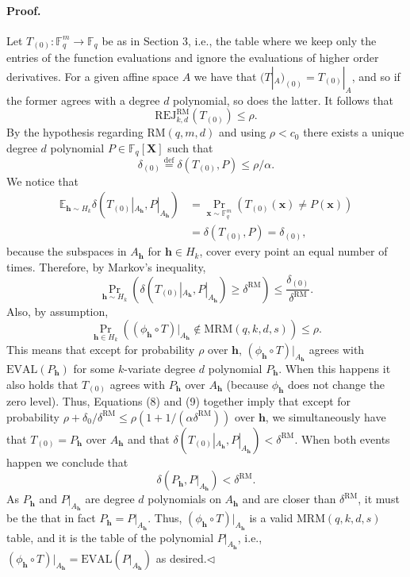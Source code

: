 \paragraph{Proof.} Let $T_{(0)}:\mathbb F_q^m\to\mathbb F_q$ be as in Section 3, i.e., the table where we keep only the entries of the function evaluations and ignore the evaluations of higher order derivatives. For a given affine space $A$ we have that $(T|_A)_{(0)}=T_{(0)}|_A$, and so if the former agrees with a degree $d$ polynomial, so does the latter. It follows that
\[\mathrm{REJ}_{k,d}^{\mathrm{RM}}(T_{(0)})\leq\rho.\]
By the hypothesis regarding $\mathrm{RM}(q,m,d)$ and using $\rho<c_0$ there exists a unique degree $d$ polynomial $P\in\mathbb F_q[\boldsymbol X]$ such that
\[\delta_{(0)}\stackrel{\mathrm{def}}=\delta(T_{(0)},P)\leq\rho/\alpha.\]
We notice that
\begin{align*}
\mathbb E_{\boldsymbol h\sim H_k}\delta(T_{(0)}|_{A_{\boldsymbol h}},P|_{A_{\boldsymbol h}})
&=\Pr_{\boldsymbol x\sim\mathbb F_q^m}(T_{(0)}(\boldsymbol x)\neq P(\boldsymbol x))\\
&=\delta(T_{(0)},P)=\delta_{(0)},
\end{align*}
because the subspaces in $A_{\boldsymbol h}$ for $\boldsymbol h\in H_k$, cover every point an equal number of times. Therefore, by Markov's inequality,
\[\Pr_{\boldsymbol h\sim H_k}(\delta(T_{(0)}|_{A_{\boldsymbol h}},P|_{A_{\boldsymbol h}})\geq\delta^{\mathrm{RM}})\leq\frac{\delta_{(0)}}{\delta^{\mathrm{RM}}}.\tag{8}\]
Also, by assumption,
\[\Pr_{\boldsymbol h\in H_k}((\phi_{\boldsymbol h}\circ T)|_{A_{\boldsymbol h}}\notin\mathrm{MRM}(q,k,d,s))\leq\rho.\tag{9}\]
This means that except for probability $\rho$ over $\boldsymbol h$, $(\phi_{\boldsymbol h}\circ T)|_{A_{\boldsymbol h}}$ agrees with $\mathrm{EVAL}(P_{\boldsymbol h})$ for some $k$-variate degree $d$ polynomial $P_{\boldsymbol h}$. When this happens it also holds that $T_{(0)}$ agrees with $P_{\boldsymbol h}$ over $A_{\boldsymbol h}$ (because $\phi_{\boldsymbol h}$ does not change the zero level).
Thus, Equations (8) and (9) together imply that except for probability $\rho+\delta_0/\delta^{\mathrm{RM}}\leq\rho(1+1/(\alpha\delta^{\mathrm{RM}}))$ over $\boldsymbol h$, we simultaneously have that $T_{(0)}=P_{\boldsymbol h}$ over $A_{\boldsymbol h}$ and that $\delta(T_{(0)}|_{A_{\boldsymbol h}},P|_{A_{\boldsymbol h}})<\delta^{\mathrm{RM}}$. When both events happen we conclude that
\[\delta(P_{\boldsymbol h},P|_{A_{\boldsymbol h}})<\delta^{\mathrm{RM}}.\]
As $P_{\boldsymbol h}$ and $P|_{A_{\boldsymbol h}}$ are degree $d$ polynomials on $A_{\boldsymbol h}$ and are closer than $\delta^{\mathrm{RM}}$, it must be the that in fact $P_{\boldsymbol h}=P|_{A_{\boldsymbol h}}$. Thus, $(\phi_{\boldsymbol h}\circ T)|_{A_{\boldsymbol h}}$ is a valid $\mathrm{MRM}(q,k,d,s)$ table, and it is the table of the polynomial $P|_{A_{\boldsymbol h}}$, i.e., $(\phi_{\boldsymbol h}\circ T)|_{A_{\boldsymbol h}}=\mathrm{EVAL}(P|_{A_{\boldsymbol h}})$ as desired.\hfill$\triangleleft$
